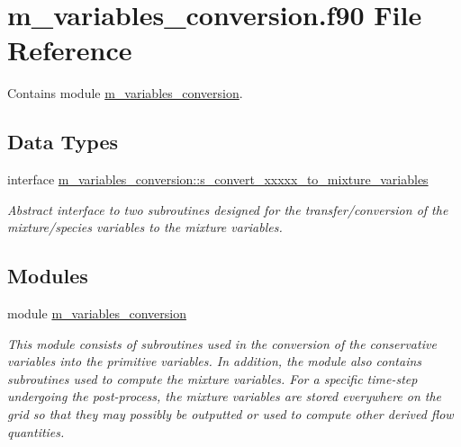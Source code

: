 \hypertarget{m__variables__conversion_8f90}{}\section{m\+\_\+variables\+\_\+conversion.\+f90 File Reference}
\label{m__variables__conversion_8f90}


Contains module \hyperlink{namespacem__variables__conversion}{m\+\_\+variables\+\_\+conversion}.  


\subsection*{Data Types}
\begin{DoxyCompactItemize}
\item 
interface \hyperlink{interfacem__variables__conversion_1_1s__convert__xxxxx__to__mixture__variables}{m\+\_\+variables\+\_\+conversion\+::s\+\_\+convert\+\_\+xxxxx\+\_\+to\+\_\+mixture\+\_\+variables}
\begin{DoxyCompactList}\small\item\em Abstract interface to two subroutines designed for the transfer/conversion of the mixture/species variables to the mixture variables. \end{DoxyCompactList}\end{DoxyCompactItemize}
\subsection*{Modules}
\begin{DoxyCompactItemize}
\item 
module \hyperlink{namespacem__variables__conversion}{m\+\_\+variables\+\_\+conversion}
\begin{DoxyCompactList}\small\item\em This module consists of subroutines used in the conversion of the conservative variables into the primitive variables. In addition, the module also contains subroutines used to compute the mixture variables. For a specific time-\/step undergoing the post-\/process, the mixture variables are stored everywhere on the grid so that they may possibly be outputted or used to compute other derived flow quantities. \end{DoxyCompactList}\end{DoxyCompactItemize}
